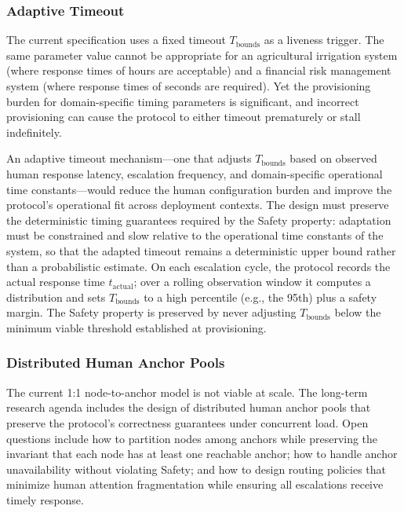 \subsubsection{Adaptive Timeout}

The current specification uses a fixed timeout $T_{\text{bounds}}$ as a liveness trigger. The same parameter value cannot be appropriate for an agricultural irrigation system (where response times of hours are acceptable) and a financial risk management system (where response times of seconds are required). Yet the provisioning burden for domain-specific timing parameters is significant, and incorrect provisioning can cause the protocol to either timeout prematurely or stall indefinitely.

An adaptive timeout mechanism---one that adjusts $T_{\text{bounds}}$ based on observed human response latency, escalation frequency, and domain-specific operational time constants---would reduce the human configuration burden and improve the protocol's operational fit across deployment contexts. The design must preserve the deterministic timing guarantees required by the Safety property: adaptation must be constrained and slow relative to the operational time constants of the system, so that the adapted timeout remains a deterministic upper bound rather than a probabilistic estimate. On each escalation cycle, the protocol records the actual response time $t_{\text{actual}}$; over a rolling observation window it computes a distribution and sets $T_{\text{bounds}}$ to a high percentile (e.g., the 95th) plus a safety margin. The Safety property is preserved by never adjusting $T_{\text{bounds}}$ below the minimum viable threshold established at provisioning.

\subsubsection{Distributed Human Anchor Pools}

The current 1:1 node-to-anchor model is not viable at scale. The long-term research agenda includes the design of distributed human anchor pools that preserve the protocol's correctness guarantees under concurrent load. Open questions include how to partition nodes among anchors while preserving the invariant that each node has at least one reachable anchor; how to handle anchor unavailability without violating Safety; and how to design routing policies that minimize human attention fragmentation while ensuring all escalations receive timely response.

